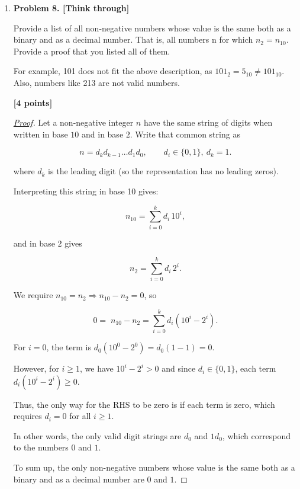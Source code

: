 \documentclass[11pt]{article}
\begin{document}
\begin{enumerate}
\item \textbf{Problem 8. [Think through]}

Provide a list of all non-negative numbers whose value is the same both as a binary and as a decimal number. That is, all numbers n for which \(n_2 = n_{10}\). Provide a proof that you listed all of them.

For example, 101 does not fit the above description, as \(101_{2} = 5_{10} \neq 101_{10}\). Also, numbers like 213 are not valid numbers.

\begin{flushright}
\textbf{[4 points]}
\end{flushright}

\begin{proof}[\underline{Proof}]

Let a non-negative integer \(n\) have the same string of digits when written in base \(10\) and in base \(2\). Write that common string as

\[
n = d_kd_{k-1}\dots d_1d_0,\qquad d_i\in\{0,1\},\ d_k=1.
\]

where \(d_k\) is the leading digit (so the representation has no leading zeros).

Interpreting this string in base 10 gives:

\[
n_{10}=\sum_{i=0}^k d_i\,10^i,
\]

and in base 2 gives

\[
n_2=\sum_{i=0}^k d_i\,2^i.
\]

We require \(n_{10}=n_2 \Rightarrow n_{10} - n_2 = 0\), so

\[
0=\;n_{10}-n_2=\sum_{i=0}^k d_i(10^i-2^i).
\]

For \(i=0\), the term is \(d_0(10^0-2^0)=d_0(1-1)=0\).

However, for \(i\ge1\), we have \(10^i-2^i>0\) and since \(d_i\in\{0,1\}\), each term \(d_i(10^i-2^i)\ge0\).

Thus, the only way for the RHS to be zero is if each term is zero, which requires \(d_i=0\) for all \(i\ge1\).

In other words, the only valid digit strings are \(d_0\) and \(1d_0\), which correspond to the numbers \(0\) and \(1\).

To sum up, the only non-negative numbers whose value is the same both as a binary and as a decimal number are \(0\) and \(1\).

\end{proof}

\end{enumerate}
\end{document}
